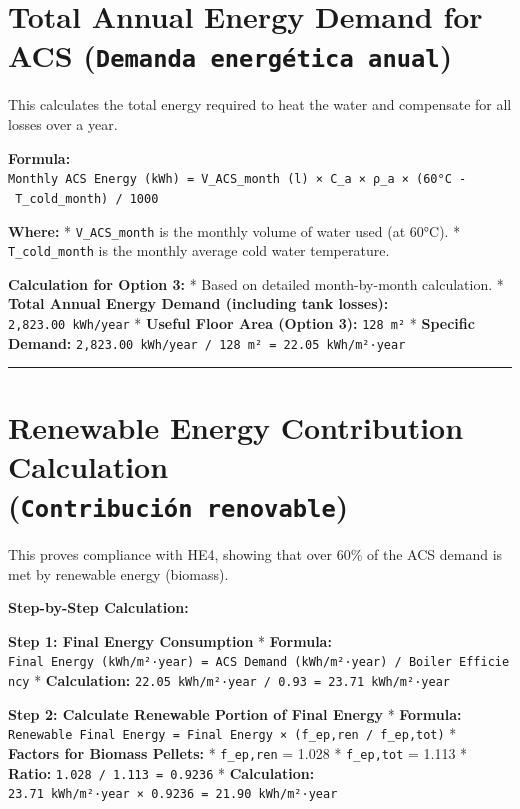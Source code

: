 \documentclass[
  10pt,
  letterpaper,
]{scrbook}
\begin{document}
\section{\texorpdfstring{Total Annual Energy Demand for ACS
(\texttt{Demanda\ energética\ anual})}{Total Annual Energy Demand for ACS (Demanda energética anual)}}\label{total-annual-energy-demand-for-acs-demanda-energuxe9tica-anual}

This calculates the total energy required to heat the water and
compensate for all losses over a year.

\textbf{Formula:}
\texttt{Monthly\ ACS\ Energy\ (kWh)\ =\ V\_ACS\_month\ (l)\ ×\ C\_a\ ×\ ρ\_a\ ×\ (60°C\ -\ T\_cold\_month)\ /\ 1000}

\textbf{Where:} * \texttt{V\_ACS\_month} is the monthly volume of water
used (at 60°C). * \texttt{T\_cold\_month} is the monthly average cold
water temperature.

\textbf{Calculation for Option 3:} * Based on detailed month-by-month
calculation. * \textbf{Total Annual Energy Demand (including tank
losses):} \texttt{2,823.00\ kWh/year} * \textbf{Useful Floor Area
(Option 3):} \texttt{128\ m²} * \textbf{Specific Demand:}
\texttt{2,823.00\ kWh/year\ /\ 128\ m²\ =\ 22.05\ kWh/m²·year}

\begin{center}\rule{0.5\linewidth}{0.5pt}\end{center}

\section{\texorpdfstring{Renewable Energy Contribution Calculation
(\texttt{Contribución\ renovable})}{Renewable Energy Contribution Calculation (Contribución renovable)}}\label{renewable-energy-contribution-calculation-contribuciuxf3n-renovable}

This proves compliance with HE4, showing that over 60\% of the ACS
demand is met by renewable energy (biomass).

\textbf{Step-by-Step Calculation:}

\textbf{Step 1: Final Energy Consumption} * \textbf{Formula:}
\texttt{Final\ Energy\ (kWh/m²·year)\ =\ ACS\ Demand\ (kWh/m²·year)\ /\ Boiler\ Efficiency}
* \textbf{Calculation:}
\texttt{22.05\ kWh/m²·year\ /\ 0.93\ =\ 23.71\ kWh/m²·year}

\textbf{Step 2: Calculate Renewable Portion of Final Energy} *
\textbf{Formula:}
\texttt{Renewable\ Final\ Energy\ =\ Final\ Energy\ ×\ (f\_ep,ren\ /\ f\_ep,tot)}
* \textbf{Factors for Biomass Pellets:} * \texttt{f\_ep,ren} = 1.028 *
\texttt{f\_ep,tot} = 1.113 * \textbf{Ratio:}
\texttt{1.028\ /\ 1.113\ =\ 0.9236} * \textbf{Calculation:}
\texttt{23.71\ kWh/m²·year\ ×\ 0.9236\ =\ 21.90\ kWh/m²·year}
\end{document}
